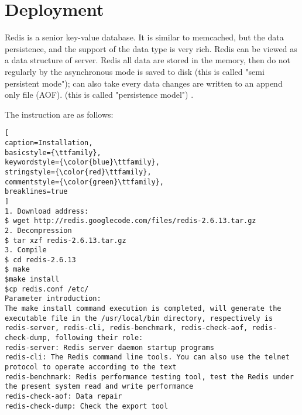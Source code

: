 \chapter{Deployment}

Redis is a senior key-value database. It is similar to memcached, but the data persistence, and the support of the data type is very rich. Redis can be viewed as a data structure of server.
Redis all data are stored in the memory, then do not regularly by the asynchronous mode is saved to disk (this is called "semi persistent mode"); can also take every data changes are written to an append only file (AOF). (this is called "persistence model") \cite{redis_basics_chinese}.

The instruction are as follows: \cite{redis_deployment}
\begin{lstlisting}[
caption=Installation,
basicstyle={\ttfamily},
keywordstyle={\color{blue}\ttfamily},
stringstyle={\color{red}\ttfamily},
commentstyle={\color{green}\ttfamily},
breaklines=true
]
1. Download address:
$ wget http://redis.googlecode.com/files/redis-2.6.13.tar.gz
2. Decompression
$ tar xzf redis-2.6.13.tar.gz
3. Compile
$ cd redis-2.6.13
$ make
$make install
$cp redis.conf /etc/
Parameter introduction:
The make install command execution is completed, will generate the executable file in the /usr/local/bin directory, respectively is redis-server, redis-cli, redis-benchmark, redis-check-aof, redis-check-dump, following their role:
redis-server: Redis server daemon startup programs
redis-cli: The Redis command line tools. You can also use the telnet protocol to operate according to the text
redis-benchmark: Redis performance testing tool, test the Redis under the present system read and write performance
redis-check-aof: Data repair
redis-check-dump: Check the export tool
\end{lstlisting}
